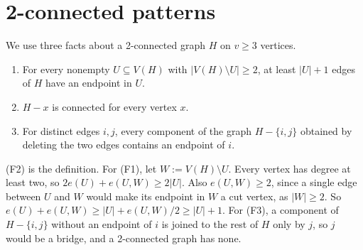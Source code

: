 \documentclass[11pt]{article}
\theoremstyle{remark}
\newcommand{\abs}[1]{\lvert #1\rvert}
\begin{document}
\section{2-connected patterns}\label{sec:2conn}

We use three facts about a 2-connected graph $H$ on $v\ge3$ vertices.
\begin{enumerate}[(F1)]
\item For every nonempty $U\subseteq V(H)$ with $\abs{V(H)\setminus U}\ge2$, at least $\abs U+1$ edges of $H$ have an endpoint in $U$.
\item $H-x$ is connected for every vertex $x$.
\item For distinct edges $i,j$, every component of the graph $H-\{i,j\}$ obtained by deleting the two edges contains an endpoint of $i$.
\end{enumerate}
(F2) is the definition. For (F1), let $W:=V(H)\setminus U$. Every vertex has degree at least two, so $2e(U)+e(U,W)\ge2\abs U$. Also $e(U,W)\ge2$, since a single edge between $U$ and $W$ would make its endpoint in $W$ a cut vertex, as $\abs W\ge2$. So $e(U)+e(U,W)\ge\abs U+e(U,W)/2\ge\abs U+1$. For (F3), a component of $H-\{i,j\}$ without an endpoint of $i$ is joined to the rest of $H$ only by $j$, so $j$ would be a bridge, and a 2-connected graph has none.
\end{document}
